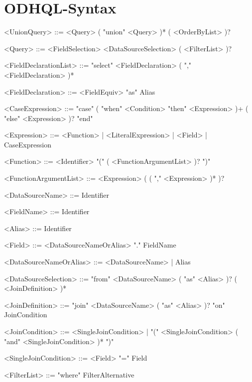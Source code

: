 \chapter{ODHQL-Syntax}\label{app:odhql-syntax}



\begin{grammar}
\small
    <UnionQuery> ::= <Query> ( "union" <Query> )* ( <OrderByList> )?

    <Query> ::= <FieldSelection>  <DataSourceSelection> ( <FilterList> )?

    <FieldDeclarationList> ::= "select" <FieldDeclaration> ( "," <FieldDeclaration> )*

    <FieldDeclaration> ::= <FieldEquiv> "as" Alias

    <CaseExpression> ::= "case" ( "when" <Condition> "then" <Expression> )+  ( "else" <Expression> )? "end"

    <Expression> ::= <Function> | <LiteralExpression> | <Field> | CaseExpression

    <Function> ::= <Identifier> "(" ( <FunctionArgumentList> )? ")"

    <FunctionArgumentList> ::= <Expression> ( ( "," <Expression> )* )?

    <DataSourceName> ::= Identifier

    <FieldName> ::= Identifier

    <Alias> ::= Identifier

    <Field> ::= <DataSourceNameOrAlias> "." FieldName

    <DataSourceNameOrAlias> ::= <DataSourceName> | Alias

    <DataSourceSelection> ::= "from" <DataSourceName> ( "as" <Alias> )? ( <JoinDefinition> )*

    <JoinDefinition> ::= "join" <DataSourceName> ( "as" <Alias> )? "on" JoinCondition

    <JoinCondition> ::= <SingleJoinCondition> | "(" <SingleJoinCondition> ( "and" <SingleJoinCondition> )* ")"

    <SingleJoinCondition> ::= <Field> "=" Field

    <FilterList> ::= "where" FilterAlternative


\end{grammar}
